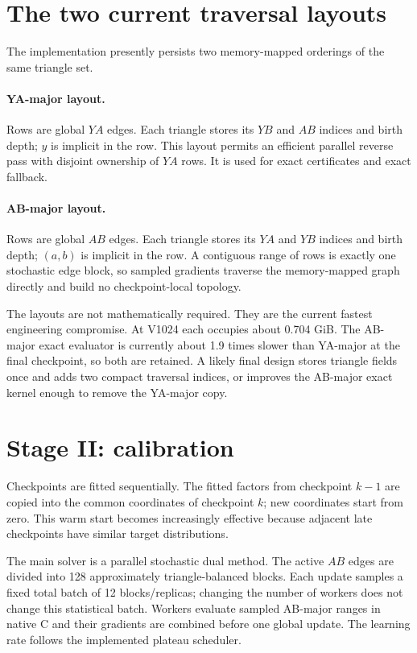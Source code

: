\documentclass[11pt]{article}
\begin{document}
\section{The two current traversal layouts}

The implementation presently persists two memory-mapped orderings of the
same triangle set.

\paragraph{YA-major layout.}
Rows are global $YA$ edges.  Each triangle stores its $YB$ and $AB$ indices
and birth depth; $y$ is implicit in the row.  This layout permits an efficient
parallel reverse pass with disjoint ownership of $YA$ rows.  It is used for
exact certificates and exact fallback.

\paragraph{AB-major layout.}
Rows are global $AB$ edges.  Each triangle stores its $YA$ and $YB$ indices
and birth depth; $(a,b)$ is implicit in the row.  A contiguous range of rows
is exactly one stochastic edge block, so sampled gradients traverse the
memory-mapped graph directly and build no checkpoint-local topology.

The layouts are not mathematically required.  They are the current fastest
engineering compromise.  At V1024 each occupies about 0.704 GiB.  The
AB-major exact evaluator is currently about 1.9 times slower than YA-major at
the final checkpoint, so both are retained.  A likely final design stores
triangle fields once and adds two compact traversal indices, or improves the
AB-major exact kernel enough to remove the YA-major copy.

\section{Stage II: calibration}

Checkpoints are fitted sequentially.  The fitted factors from checkpoint
$k-1$ are copied into the common coordinates of checkpoint $k$; new
coordinates start from zero.  This warm start becomes increasingly effective
because adjacent late checkpoints have similar target distributions.

The main solver is a parallel stochastic dual method.  The active $AB$ edges
are divided into 128 approximately triangle-balanced blocks.  Each update
samples a fixed total batch of 12 blocks/replicas; changing the number of
workers does not change this statistical batch.  Workers evaluate sampled
AB-major ranges in native C and their gradients are combined before one
global update.  The learning rate follows the implemented plateau scheduler.
\end{document}
